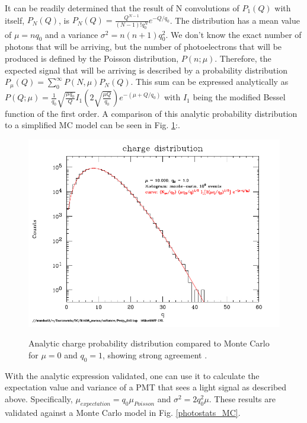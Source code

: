It can be readily determined that the result of N convolutions of $P_1(Q)$ with itself, $P_N(Q)$,  is $P_N(Q) = \frac{Q^{N-1}}{(N-1)!q_0^N}e^{-Q/q_0}$. The distribution has a mean value of $\mu=nq_0$ and a variance $\sigma^2=n(n+1)q_0^2$. We don't know the exact number of photons that will be arriving, but the number of photoelectrons that will be produced is defined by the Poisson distribution, $P(n;\mu)$. Therefore, the expected signal that will be arriving is described by a probability distribution $P_\mu(Q) = \sum \limits_0^\infty P(N, \mu)P_{N}(Q)$. This sum can be expressed analytically as $P(Q; \mu) = \frac{1}{q_0}\sqrt{\frac{\mu q_0}{Q}}I_1(2\sqrt{\frac{\mu Q}{q_0}})e^{-(\mu+Q/q_0)}$ with $I_1$ being the modified Bessel function of the first order. A comparison of this analytic probability distribution to a simplified MC model can be seen in Fig. \ref{PMT_Cal_MC}:.

\begin{figure}
\caption{Analytic charge probability distribution compared to Monte Carlo for $\mu =0$ and $q_0=1$, showing strong agreement \cite{PMTCalibration}.}
\includegraphics[width=\textwidth]{DC_Results/PMT_Cal_MC_Comp.jpg}
\label{PMT_Cal_MC}
\end{figure}

With the analytic expression validated, one can use it to calculate the expectation value and variance of a PMT that sees a light signal as described above. Specifically, $\mu_{expectation} = q_0 \mu_{Poisson}$ and $\sigma^2 = 2 q_0^2 \mu$. These results are validated against a Monte Carlo model in Fig. \ref{photostats_MC}. 


